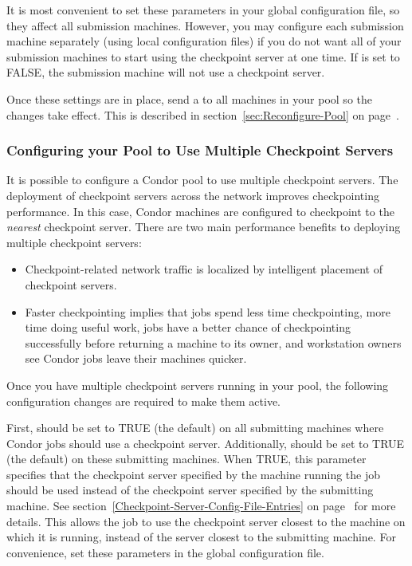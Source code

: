 It is most convenient to set these parameters in your global configuration file,
so they affect all submission machines.
However, you may configure each submission machine separately (using
local configuration files) if you do not want all of your submission machines
to start using the checkpoint server at one time.
If  is set to FALSE, the
submission machine will not use a checkpoint server.

Once these settings are in place, send a
 to all machines in your pool so the changes take
effect.
This is described in section~\ref{sec:Reconfigure-Pool} on
page~\pageref{sec:Reconfigure-Pool}.

\subsubsection{\label{Configure-Multiple-Ckpt-Server} 
Configuring your Pool to Use Multiple Checkpoint Servers}


It is possible to configure a Condor pool to use multiple checkpoint
servers.
The deployment of
checkpoint servers across the
network improves checkpointing performance.
In this case, Condor machines are configured to checkpoint to the
\emph{nearest} checkpoint server.
There are two main performance benefits to deploying multiple checkpoint
servers:
\begin{itemize}
\item Checkpoint-related network traffic is localized by
intelligent placement of checkpoint servers.
\item Faster checkpointing implies that jobs spend less time
checkpointing, more time doing useful work, jobs have a better
chance of checkpointing successfully before returning a
machine to its owner, and workstation
owners see Condor jobs leave their machines quicker.
\end{itemize}

Once you have multiple checkpoint servers running in your pool, the
following configuration changes are required to make them active.

First,  should be set to TRUE (the default) on all
submitting machines where Condor jobs should use a checkpoint server.
Additionally,  should be set to
TRUE (the default) on these submitting machines.
When TRUE, this parameter specifies that the checkpoint server
specified by the machine running the job should be used instead of the
checkpoint server specified by the submitting machine.
See section~\ref{Checkpoint-Server-Config-File-Entries} on
page~\pageref{Checkpoint-Server-Config-File-Entries} for more
details.
This allows the job to use the checkpoint server closest to the
machine on which it is running, instead of the server closest to the
submitting machine.
For convenience, set these parameters in the
global configuration file.

